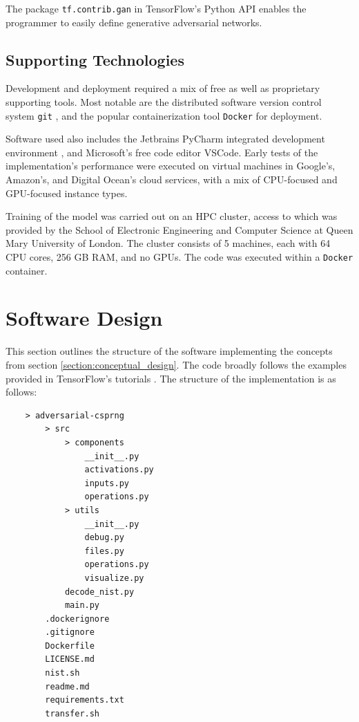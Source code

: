 \documentclass[12pt, titlepage]{report}
\theoremstyle{definition}
\begin{document}
The package \texttt{tf.contrib.gan} in TensorFlow's Python API enables the programmer to easily define generative adversarial networks.



\subsection{Supporting Technologies}
Development and deployment required a mix of free as well as proprietary supporting tools. Most notable are the distributed software version control system \texttt{git} \cite{git2018}, and the popular containerization tool \texttt{Docker} \cite{docker2018} for deployment.

Software used also includes the Jetbrains PyCharm integrated development environment \cite{jetbrains2018pycharm}, and Microsoft's free code editor VSCode. Early tests of the implementation's performance were executed on virtual machines in Google's, Amazon's, and Digital Ocean's cloud services, with a mix of CPU-focused and GPU-focused instance types.

Training of the model was carried out on an HPC cluster, access to which was provided by the School of Electronic Engineering and Computer Science at Queen Mary University of London. The cluster consists of 5 machines, each with 64 CPU cores, 256 GB RAM, and no GPUs. The code was executed within a \texttt{Docker} container.


\section{Software Design}
This section outlines the structure of the software implementing the concepts from section \ref{section:conceptual_design}. The code broadly follows the examples provided in TensorFlow's tutorials \cite{tensorflow2018tutorials} \cite{tensorflow2018tfgan}. The structure of the implementation is as follows:

\begin{verbatim}
    > adversarial-csprng    
        > src
            > components
                __init__.py
                activations.py
                inputs.py
                operations.py
            > utils
                __init__.py
                debug.py
                files.py
                operations.py
                visualize.py
            decode_nist.py
            main.py
        .dockerignore    
        .gitignore
        Dockerfile
        LICENSE.md
        nist.sh
        readme.md
        requirements.txt
        transfer.sh
\end{verbatim}
\end{document}
